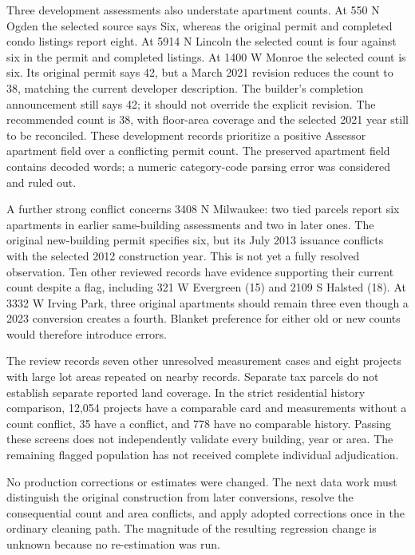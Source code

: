 Three development assessments also understate apartment counts. At
550 N Ogden the selected source says Six, whereas the original permit
and completed condo listings report eight. At 5914 N Lincoln the
selected count is four against six in the permit and completed listings.
At 1400 W Monroe the selected count is six. Its original permit says
42, but a March 2021 revision reduces the count to 38, matching the
current developer description. The builder's completion announcement
still says 42; it should not override the explicit revision. The
recommended count is 38, with floor-area coverage and the selected 2021
year still to be reconciled. These development records prioritize a
positive Assessor apartment field over a conflicting permit count.
The preserved apartment field contains decoded words; a numeric
category-code parsing error was considered and ruled out.

A further strong conflict concerns 3408 N Milwaukee: two tied parcels
report six apartments in earlier same-building assessments and two in
later ones. The original new-building permit specifies six, but its
July 2013 issuance conflicts with the selected 2012 construction year.
This is not yet a fully resolved observation. Ten other reviewed records
have evidence supporting their current count despite a flag, including
321 W Evergreen (15) and 2109 S Halsted (18). At 3332 W Irving Park,
three original apartments should remain three even though a 2023
conversion creates a fourth. Blanket preference for either old or new
counts would therefore introduce errors.

The review records seven other unresolved measurement cases and eight
projects with large lot areas repeated on nearby records. Separate tax
parcels do not establish separate reported land coverage. In the strict
residential history comparison, 12,054 projects have a comparable card
and measurements without a count conflict, 35 have a conflict, and 778
have no comparable history. Passing these screens does not independently
validate every building, year or area. The remaining flagged population
has not received complete individual adjudication.

No production corrections or estimates were changed. The next data work
must distinguish the original construction from later conversions,
resolve the consequential count and area conflicts, and apply adopted
corrections once in the ordinary cleaning path. The magnitude of the
resulting regression change is unknown because no re-estimation was run.

